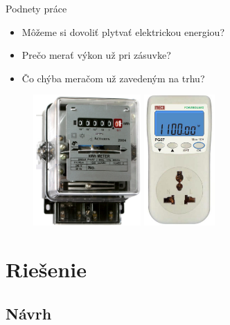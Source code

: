 \documentclass[hyperref={unicode}]{beamer}
\begin{document}
\begin{frame}{Podnety práce}
	\begin{itemize}
		\item Môžeme si dovoliť plytvať elektrickou energiou?
		\item Prečo merať výkon už pri zásuvke?
		\item Čo chýba meračom už zavedeným na trhu?
	\end{itemize}


	\begin{figure}[htp]
		\centering
		\includegraphics[height=5cm]{analog-power-meter}
		\hspace{1cm}
		\includegraphics[height=5cm]{digital-plug-meter}
	\end{figure}

\end{frame}



\section{Riešenie}
\label{sec:Riešenie}

\subsection{Návrh}
\label{sub:Návrh}
\end{document}
